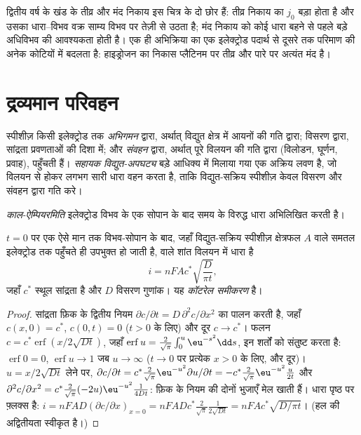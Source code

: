 द्वितीय वर्ष के खंड के तीव्र और मंद निकाय इस चित्र के दो छोर हैं: तीव्र निकाय का
$j_0$ बड़ा होता है और उसका धारा--विभव वक्र साम्य विभव पर तेज़ी से
उठता है; मंद निकाय को कोई धारा बहने से पहले बड़े अधिविभव की आवश्यकता होती है।
एक ही अभिक्रिया का  एक इलेक्ट्रोड पदार्थ से दूसरे तक परिमाण की अनेक
कोटियों में बदलता है: हाइड्रोजन का निकास प्लैटिनम पर तीव्र और पारे पर अत्यंत मंद है।

\section{द्रव्यमान परिवहन}

\begin{definition}[द्रव्यमान परिवहन की विधाएँ]\label{def:b3:electrode-kinetics:transport}
स्पीशीज़ किसी इलेक्ट्रोड तक \emph{अभिगमन} द्वारा, अर्थात् विद्युत क्षेत्र में आयनों
की गति द्वारा; विसरण द्वारा, सांद्रता प्रवणताओं की दिशा में; और
\emph{संवहन} द्वारा, अर्थात् पूरे विलयन की गति द्वारा
(विलोडन, घूर्णन, प्रवाह), पहुँचती हैं। \emph{सहायक विद्युत-अपघट्य}
बड़े आधिक्य में मिलाया गया एक अक्रिय लवण है, जो विलयन से होकर लगभग सारी
धारा वहन करता है, ताकि विद्युत-सक्रिय स्पीशीज़ केवल विसरण और संवहन द्वारा
गति करे।
\end{definition}

\begin{definition}[काल-ऐम्पियरमिति]\label{def:b3:electrode-kinetics:chronoamperometry}
\emph{काल-ऐम्पियरमिति} इलेक्ट्रोड विभव के एक सोपान के बाद
समय के विरुद्ध धारा अभिलिखित करती है।
\end{definition}

\begin{theorem}[कॉटरेल समीकरण]\label{thm:b3:electrode-kinetics:cottrell}
$t = 0$ पर एक ऐसे मान तक विभव-सोपान के बाद, जहाँ विद्युत-सक्रिय स्पीशीज़
क्षेत्रफल $A$ वाले समतल इलेक्ट्रोड तक पहुँचते ही उपभुक्त हो जाती है,  वाले शांत विलयन में धारा है
\[
  i = nFAc^*\sqrt{\frac{D}{\pi t}},
\]
जहाँ $c^*$ स्थूल सांद्रता है और $D$ विसरण गुणांक। यह
\emph{कॉटरेल समीकरण} है।
\end{theorem}

\begin{proof}
सांद्रता फ़िक के द्वितीय नियम $\partial c/\partial t = D\,\partial^2c/\partial x^2$ का पालन करती है, जहाँ $c(x, 0) = c^*$,
$c(0, t) = 0$ ($t > 0$ के लिए) और दूर $c \to c^*$। फलन $c = c^*\operatorname{erf}(x/2\sqrt{Dt})$, जहाँ
$\operatorname{erf}u = \frac{2}{\sqrt\pi}\int_0^u\eu^{-s^2}\dd s$, इन शर्तों को संतुष्ट करता है: $\operatorname{erf}0 = 0$, $\operatorname{erf}u \to 1$ जब $u \to \infty$
($t \to 0$ पर प्रत्येक $x > 0$ के लिए, और दूर)। $u = x/2\sqrt{Dt}$ लेने पर,
$\partial c/\partial t = c^*\frac{2}{\sqrt\pi}\eu^{-u^2}\partial u/\partial t = -c^*\frac{2}{\sqrt\pi}\eu^{-u^2}\frac{u}{2t}$ और $\partial^2c/\partial x^2 = c^*\frac{2}{\sqrt\pi}(-2u)\eu^{-u^2}\frac{1}{4Dt}$: फ़िक के नियम की
दोनों भुजाएँ मेल खाती हैं। धारा पृष्ठ पर फ़्लक्स है: $i =
nFAD(\partial c/\partial x)_{x = 0} = nFADc^*\frac{2}{\sqrt\pi}\frac{1}{2\sqrt{Dt}} = nFAc^*\sqrt{D/\pi t}$। (हल की अद्वितीयता
स्वीकृत है।)
\end{proof}

